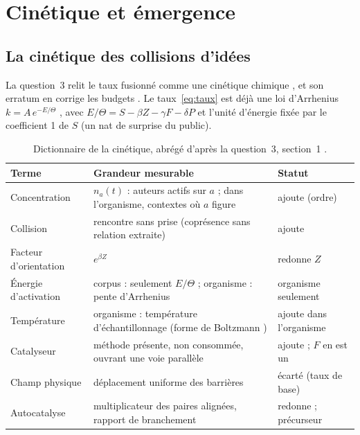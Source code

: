 \documentclass[11pt,a4paper]{article}
\theoremstyle{definition}
\theoremstyle{plain}
\begin{document}
\section{Cinétique et émergence}
\label{sec:cinetique}

\subsection{La cinétique des collisions d'idées}

La question~3 relit le taux fusionné comme une cinétique chimique \cite{q3}, et son erratum en
corrige les budgets \cite{erratumq3}. Le taux~\eqref{eq:taux} est déjà une loi d'Arrhenius
$k=A\,e^{-E/\Theta}$ \cite{arrhenius1889}, avec $E/\Theta=S-\beta Z-\gamma F-\delta P$ et l'unité
d'énergie fixée par le coefficient 1 de $S$ (un nat de surprise du public).

\begin{table}[ht]
\centering\small
\caption{Dictionnaire de la cinétique, abrégé d'après la question~3, section~1 \cite{q3}.}
\label{tab:dico}
\begin{tabularx}{\textwidth}{@{}lXl@{}}
\toprule
Terme & Grandeur mesurable & Statut \\
\midrule
Concentration & $n_a(t)$ : auteurs actifs sur $a$ ; dans l'organisme, contextes où $a$ figure & ajoute (ordre) \\
Collision & rencontre sans prise (coprésence sans relation extraite) & ajoute \\
Facteur d'orientation & $e^{\beta Z}$ & redonne $Z$ \\
Énergie d'activation & corpus : seulement $E/\Theta$ ; organisme : pente d'Arrhenius & organisme seulement \\
Température & organisme : température d'échantillonnage (forme de Boltzmann \cite[éq.~(1), p.~2-3]{hinton2015}) & ajoute dans l'organisme \\
Catalyseur & méthode présente, non consommée, ouvrant une voie parallèle & ajoute ; $F$ en est un \\
Champ physique & déplacement uniforme des barrières & écarté (taux de base) \\
Autocatalyse & multiplicateur des paires alignées, rapport de branchement & redonne ; précurseur \\
\bottomrule
\end{tabularx}
\end{table}
\end{document}
